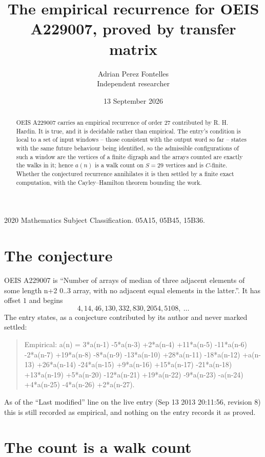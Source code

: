 \documentclass[11pt,a4paper]{article}
\title{The empirical recurrence for OEIS A229007, proved by transfer matrix}
\author{Adrian Perez Fontelles\\ \small Independent researcher}
\date{13 September 2026}
\theoremstyle{plain}
\theoremstyle{definition}
\begin{document}
\maketitle

\begin{abstract}
OEIS A229007 carries an empirical recurrence of order $27$ contributed by R. H. Hardin. It is
true, and it is decidable rather than empirical. The entry's condition is local to a set of input windows -- those consistent with the output word so far -- states with the same future behaviour being identified, so
the admissible configurations of such a window are the vertices of a finite digraph and the
arrays counted are exactly the walks in it; hence $a(n)$ is a walk count on $S=29$ vertices
and is $C$-finite. Whether the conjectured recurrence annihilates it is then settled by a
finite exact computation, with the Cayley--Hamilton theorem bounding the work.
\end{abstract}

\noindent\small 2020 Mathematics Subject Classification. 05A15, 05B45, 15B36.\normalsize

\section{The conjecture}

OEIS A229007 is ``Number of arrays of median of three adjacent elements of some length n+2 0..3 array, with no adjacent equal elements in the latter.''. It has offset $1$ and begins
\[
4, 14, 46, 130, 332, 830, 2054, 5108,\ \dots
\]
The entry states, as a conjecture contributed by its author and never marked settled:
\begin{quote}
Empirical: a(n) = 3*a(n-1) -5*a(n-3) +2*a(n-4) +11*a(n-5) -11*a(n-6) -2*a(n-7) +19*a(n-8) -8*a(n-9) -13*a(n-10) +28*a(n-11) -18*a(n-12) +a(n-13) +26*a(n-14) -24*a(n-15) +9*a(n-16) +15*a(n-17) -21*a(n-18) +13*a(n-19) +5*a(n-20) -12*a(n-21) +19*a(n-22) -9*a(n-23) -a(n-24) +4*a(n-25) -4*a(n-26) +2*a(n-27).
\end{quote}
As of the ``Last modified'' line on the live entry (Sep 13 2013 20:11:56, revision 8) this is still
recorded as empirical, and nothing on the entry records it as proved.

\section{The count is a walk count}
\end{document}
